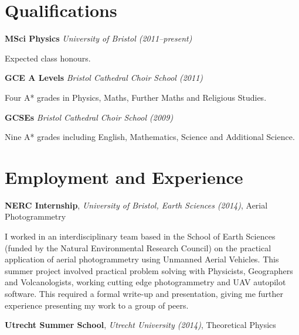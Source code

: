 \documentclass[11pt,a4paper,sans]{moderncv}
\begin{document}
\vspace*{-2.5\baselineskip}
\makecvtitle

\vspace*{-2\baselineskip}

\vspace{5pt}

\section{Qualifications}

{\large\textbf{MSci Physics} \textit{University of Bristol (2011--present)} }

Expected  class honours.

\vspace{1em}
{\large\textbf{GCE A Levels} \textit{Bristol Cathedral Choir School (2011)} }

Four A* grades in Physics, Maths, Further Maths and Religious Studies.

\vspace{1em}
{\large\textbf{GCSEs} \textit{Bristol Cathedral Choir School (2009)} }

Nine A* grades including English, Mathematics, Science and Additional Science.

\vspace{5pt}

\section{Employment and Experience}

\vspace{2pt}

{\large\textbf{NERC Internship}, \textit{University of Bristol, Earth Sciences
(2014)}, Aerial Photogrammetry}

I worked in an interdisciplinary team based in the School of Earth Sciences
(funded by the Natural Environmental Research Council) on the practical
application of aerial photogrammetry using Unmanned Aerial Vehicles. This summer
project involved practical problem solving with Physicists, Geographers and
Volcanologists, working cutting edge photogrammetry and UAV autopilot software.
This required a formal write-up and presentation, giving me further experience
presenting my work to a group of peers.

\vspace{1em}

{\large\textbf{Utrecht Summer School}, \textit{Utrecht University (2014)}, Theoretical
Physics}
\end{document}
